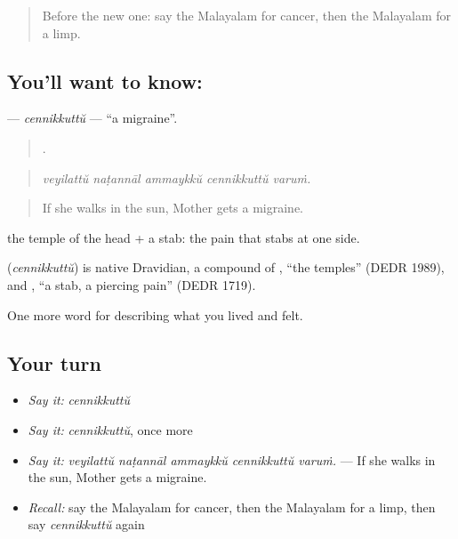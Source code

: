 \label{lesson:ML-C535-cennikkuttu}



\begin{quote}
Before the new one: say the Malayalam for cancer, then the Malayalam for a limp.
\end{quote}

\subsection*{You'll want to know: }
\textbf{} — \emph{cennikkuttŭ} — \textquotedblleft{}a migraine\textquotedblright{}.

\begin{quote}
    .
\end{quote}

\begin{quote}
\emph{veyilattŭ naṭannāl ammaykkŭ cennikkuttŭ varuṁ.}
\end{quote}

\begin{quote}
If she walks in the sun, Mother gets a migraine.
\end{quote}

 the temple of the head +  a stab: the pain that stabs at one side.

\begin{cousinweb}
\textbf{} (\emph{cennikkuttŭ}) is native Dravidian, a compound of , \textquotedblleft{}the temples\textquotedblright{} (DEDR 1989), and , \textquotedblleft{}a stab, a piercing pain\textquotedblright{} (DEDR 1719).
\end{cousinweb}

\begin{grammarlens}[title={What you've built}]
One more word for describing what you lived and felt.
\end{grammarlens}

\subsection*{Your turn}
\begin{itemize}
\raggedright
  \item \emph{Say it:} \emph{cennikkuttŭ}
  \item \emph{Say it:} \emph{cennikkuttŭ}, once more
  \item \emph{Say it:} \emph{veyilattŭ naṭannāl ammaykkŭ cennikkuttŭ varuṁ.} — If she walks in the sun, Mother gets a migraine.
  \item \emph{Recall:} say the Malayalam for cancer, then the Malayalam for a limp, then say \emph{cennikkuttŭ} again
\end{itemize}

